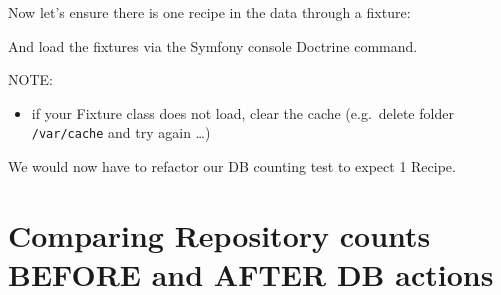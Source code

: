 \documentclass[a4paperpaper,openright]{book}
\newenvironment{Shaded}{}{}
\newcommand{\DecValTok}[1]{\textcolor[rgb]{0.25,0.63,0.44}{#1}}
\newcommand{\FunctionTok}[1]{\textcolor[rgb]{0.02,0.16,0.49}{#1}}
\newcommand{\KeywordTok}[1]{\textcolor[rgb]{0.00,0.44,0.13}{\textbf{#1}}}
\newcommand{\NormalTok}[1]{#1}
\newcommand{\OtherTok}[1]{\textcolor[rgb]{0.00,0.44,0.13}{#1}}
\newcommand{\StringTok}[1]{\textcolor[rgb]{0.25,0.44,0.63}{#1}}
\providecommand{\tightlist}{%
  \setlength{\itemsep}{0pt}\setlength{\parskip}{0pt}}
\begin{document}
Now let's ensure there is one recipe in the data through a fixture:

\begin{Shaded}
\end{Shaded}

And load the fixtures via the Symfony console Doctrine command.

NOTE:

\begin{itemize}
\tightlist
\item
  if your Fixture class does not load, clear the cache (e.g.~delete
  folder \texttt{/var/cache} and try again \ldots{})
\end{itemize}

We would now have to refactor our DB counting test to expect 1 Recipe.

\hypertarget{comparing-repository-counts-before-and-after-db-actions}{%
\section{Comparing Repository counts BEFORE and AFTER DB
actions}\label{comparing-repository-counts-before-and-after-db-actions}}
\end{document}
